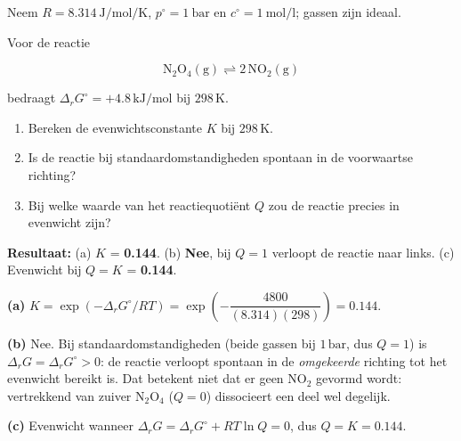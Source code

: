 
Neem $R = \SI{8.314}{\joule\per\mole\per\kelvin}$, $p^\circ = \SI{1}{\bar}$ en $c^\circ = \SI{1}{\mole\per\litre}$; gassen zijn ideaal.

\begin{oefening}\label{oef:h6-1}
Voor de reactie

\[
\mathrm{N_2O_4(g) \rightleftharpoons 2\,NO_2(g)}
\]

bedraagt \(\Delta_r G^\circ = +4.8\,\mathrm{kJ/mol}\) bij \(298\,\mathrm{K}\).

\begin{enumerate}
\item[(a)]
  Bereken de evenwichtsconstante \(K\) bij \(298\,\mathrm{K}\).
\item[(b)]
  Is de reactie bij standaardomstandigheden spontaan in de voorwaartse richting?
\item[(c)]
  Bij welke waarde van het reactiequotiënt \(Q\) zou de reactie precies in evenwicht zijn?
\end{enumerate}
\end{oefening}
\begin{oplossing}
\textbf{Resultaat:} (a) \(K\) = \textbf{0.144}. (b) \textbf{Nee}, bij \(Q = 1\) verloopt de reactie naar links. (c) Evenwicht bij \(Q = K\) = \textbf{0.144}.

\textbf{(a)} \(K = \exp(-\Delta_r G^\circ/RT) = \exp\!\left(-\dfrac{4800}{(8.314)(298)}\right) = 0.144\).

\textbf{(b)} Nee. Bij standaardomstandigheden (beide gassen bij \(1\,\mathrm{bar}\), dus \(Q = 1\)) is \(\Delta_r G = \Delta_r G^\circ > 0\): de reactie verloopt spontaan in de \emph{omgekeerde} richting tot het evenwicht bereikt is. Dat betekent niet dat er geen \(\mathrm{NO_2}\) gevormd wordt: vertrekkend van zuiver \(\mathrm{N_2O_4}\) (\(Q = 0\)) dissocieert een deel wel degelijk.

\textbf{(c)} Evenwicht wanneer \(\Delta_r G = \Delta_r G^\circ + RT\ln Q = 0\), dus \(Q = K = 0.144\).
\end{oplossing}

